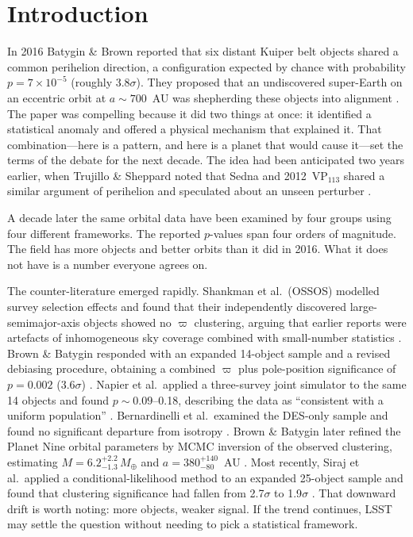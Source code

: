 \documentclass{aa}
\begin{document}

\maketitle

\section{Introduction}

In 2016 Batygin \& Brown reported that six distant Kuiper belt objects shared a common perihelion direction, a configuration expected by chance with probability $p=7\times10^{-5}$ (roughly 3.8$\sigma$). They proposed that an undiscovered super-Earth on an eccentric orbit at $a\sim700$~AU was shepherding these objects into alignment \citep{batygin2016}. The paper was compelling because it did two things at once: it identified a statistical anomaly and offered a physical mechanism that explained it. That combination---here is a pattern, and here is a planet that would cause it---set the terms of the debate for the next decade. The idea had been anticipated two years earlier, when Trujillo \& Sheppard noted that Sedna and 2012~VP$_{113}$ shared a similar argument of perihelion and speculated about an unseen perturber \citep{trujillo2014}.

A decade later the same orbital data have been examined by four groups using four different frameworks. The reported $p$-values span four orders of magnitude. The field has more objects and better orbits than it did in 2016. What it does not have is a number everyone agrees on.

The counter-literature emerged rapidly. Shankman et al.\ (OSSOS) modelled survey selection effects and found that their independently discovered large-semimajor-axis objects showed no $\varpi$ clustering, arguing that earlier reports were artefacts of inhomogeneous sky coverage combined with small-number statistics \citep{shankman2017}. Brown \& Batygin responded with an expanded 14-object sample and a revised debiasing procedure, obtaining a combined $\varpi$ plus pole-position significance of $p=0.002$ (3.6$\sigma$) \citep{brown2019}. Napier et al.\ applied a three-survey joint simulator to the same 14 objects and found $p\sim0.09$--0.18, describing the data as ``consistent with a uniform population'' \citep{napier2021}. Bernardinelli et al.\ examined the DES-only sample and found no significant departure from isotropy \citep{bernardinelli2020}. Brown \& Batygin later refined the Planet Nine orbital parameters by MCMC inversion of the observed clustering, estimating $M = 6.2^{+2.2}_{-1.3}\,M_\oplus$ and $a = 380^{+140}_{-80}$~AU \citep{brown2021}. Most recently, Siraj et al.\ applied a conditional-likelihood method to an expanded 25-object sample and found that clustering significance had fallen from 2.7$\sigma$ to 1.9$\sigma$ \citep{siraj2025,siraj2026}. That downward drift is worth noting: more objects, weaker signal. If the trend continues, LSST may settle the question without needing to pick a statistical framework.
\end{document}
